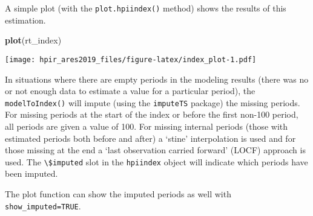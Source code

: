 \documentclass[]{article}
\newenvironment{Shaded}{\begin{snugshade}}{\end{snugshade}}
\newcommand{\KeywordTok}[1]{\textcolor[rgb]{0.13,0.29,0.53}{\textbf{#1}}}
\newcommand{\DataTypeTok}[1]{\textcolor[rgb]{0.13,0.29,0.53}{#1}}
\newcommand{\DecValTok}[1]{\textcolor[rgb]{0.00,0.00,0.81}{#1}}
\newcommand{\StringTok}[1]{\textcolor[rgb]{0.31,0.60,0.02}{#1}}
\newcommand{\OtherTok}[1]{\textcolor[rgb]{0.56,0.35,0.01}{#1}}
\newcommand{\OperatorTok}[1]{\textcolor[rgb]{0.81,0.36,0.00}{\textbf{#1}}}
\newcommand{\NormalTok}[1]{#1}
\begin{document}
A simple plot (with the \texttt{plot.hpiindex()} method) shows the
results of this estimation.

\begin{Shaded}
\begin{Highlighting}[]
  \KeywordTok{plot}\NormalTok{(rt_index)}
\end{Highlighting}
\end{Shaded}

\texttt{[image: hpir\_ares2019\_files/figure-latex/index\_plot-1.pdf]}

In situations where there are empty periods in the modeling results
(there was no or not enough data to estimate a value for a particular
period), the \texttt{modelToIndex()} will impute (using the
\texttt{imputeTS} package) the missing periods. For missing periods at
the start of the index or before the first non-100 period, all periods
are given a value of 100. For missing internal periods (those with
estimated periods both before and after) a `stine' interpolation is used
and for those missing at the end a `last observation carried forward'
(LOCF) approach is used. The \texttt{\textbackslash{}\$imputed} slot in
the \texttt{hpiindex} object will indicate which periods have been
imputed.

\begin{Shaded}
\end{Shaded}

The plot function can show the imputed periods as well with
\texttt{show\_imputed=TRUE}.
\end{document}

